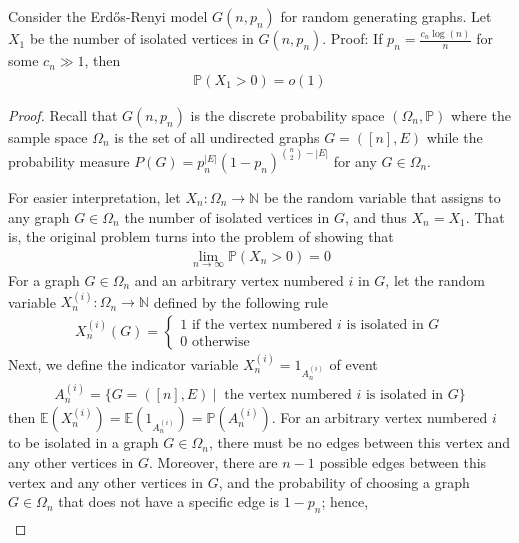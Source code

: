 \begin{problem}
  Consider the Erdős-Renyi model $G(n, p_{n})$ for random generating graphs. Let $X_{1}$ be the number of isolated vertices in $G(n, p_{n})$. Proof: If $p_{n} = \frac{c_{n} \log(n)}{n}$ for some $c_{n} \gg 1$, then
  \begin{align*}
    \mathbb{P}(X_{1} > 0) = o(1)
  \end{align*}
\end{problem}
\begin{proof}
  Recall that $G(n, p_{n})$ is the discrete probability space $(\Omega_{n}, \mathbb{P})$ where the sample space $\Omega_{n}$ is the set of all undirected graphs $G = ([n], E)$ while the probability measure $P(G) = p_{n}^{|E|}(1-p_{n})^{\binom{n}{2} - |E|}$ for any $G \in \Omega_{n}$.

  For easier interpretation, let $X_{n} : \Omega_{n} \to \mathbb{N}$ be the random variable that assigns to any graph $G \in \Omega_{n}$ the number of isolated vertices in $G$, and thus $X_{n} = X_{1}$. That is, the original problem turns into the problem of showing that
  \begin{align*}
    \lim_{n \to \infty} \mathbb{P}(X_{n} > 0) = 0 \tag{3.1}
  \end{align*}
  For a graph $G \in \Omega_{n}$ and an arbitrary vertex numbered $i$ in $G$, let the random variable $X_{n}^{(i)} : \Omega_{n} \to \mathbb{N}$ defined by the following rule  
  \begin{align*}
    X_{n}^{(i)}(G) = 
    \begin{cases}
      1 \text{ if the vertex numbered $i$ is isolated in $G$} \\
      0 \text{ otherwise}
    \end{cases}
  \end{align*}
  Next, we define the indicator variable $X_{n}^{(i)} = 1_{A_{n}^{(i)}}$ of event 
  \begin{align*}
    A_{n}^{(i)} = \{ G = ([n], E) \ | \ \text{ the vertex numbered $i$ is isolated in $G$}\} 
  \end{align*}
  then $\mathbb{E}(X_{n}^{(i)}) = \mathbb{E}(1_{A_{n}^{(i)}}) = \mathbb{P}(A_{n}^{(i)})$. For an arbitrary vertex numbered $i$ to be isolated in a graph $G \in \Omega_{n}$, there must be no edges between this vertex and any other vertices in $G$. Moreover, there are $n-1$ possible edges between this vertex and any other vertices in $G$, and the probability of choosing a graph $G \in \Omega_{n}$ that does not have a specific edge is $1 - p_{n}$; hence,
  \begin{align*}

\end{align*}
\end{proof}

